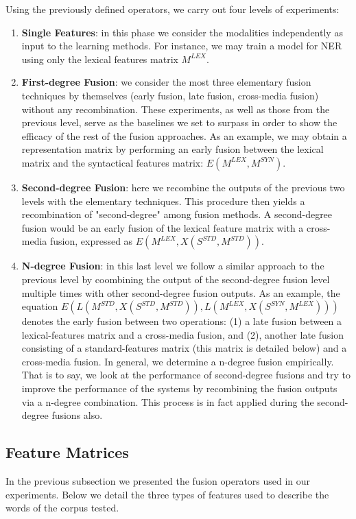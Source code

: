 \documentclass{llncs}
\begin{document}
Using the previously defined operators, we carry out four levels of experiments: 
\begin{enumerate}
\item \textbf{Single Features}: in this phase we consider the modalities independently as input to the learning methods. For instance, we may train a model for NER using only the lexical features matrix $M^{LEX}$.
\item \textbf{First-degree Fusion}: we  consider the most three elementary fusion techniques by themselves (early fusion, late fusion, cross-media fusion) without any recombination.  These experiments, as well as those from the previous level, serve as the baselines we set to surpass in order to show the efficacy of the rest of the fusion approaches.
As an example, we may obtain a representation matrix by performing an early fusion between the lexical matrix and the syntactical features matrix: $E(M^{LEX}, M^{SYN})$.
\item \textbf{Second-degree Fusion}: here we recombine the outputs of the previous two levels with the elementary techniques. This procedure then yields a recombination of "second-degree" among fusion methods. A second-degree fusion would be an early fusion of the lexical feature matrix with a cross-media fusion, expressed as $E(M^{LEX}, X(S^{STD}, M^{STD}))$.   
\item \textbf{N-degree Fusion}: in this last level we follow a similar approach to the previous level by coombining the output of the second-degree fusion level multiple times with other second-degree fusion outputs. As an example, the equation $E(L(M^{STD}, \allowbreak X(S^{STD}, M^{STD})),  L(M^{LEX}, X(S^{SYN}, M^{LEX})))$  denotes the early fusion between two operations: (1) a late fusion between a lexical-features matrix and a cross-media fusion, and (2),  another late fusion consisting of a standard-features matrix (this matrix is detailed below)  and a cross-media fusion. In general, we determine a n-degree fusion empirically. That is to say, we look at the performance of second-degree fusions and try to improve the performance of the systems by recombining the fusion outputs via a n-degree combination. This process is in fact applied during the second-degree fusions also. 
	\end{enumerate}   
\subsection{Feature Matrices}
In the previous subsection we presented the fusion operators used in our experiments. Below we detail the three types of features used to describe the words of the corpus tested.
\end{document}
